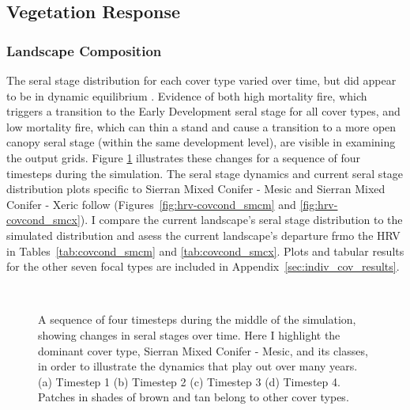 \clearpage



\subsection{Vegetation Response}
\label{subsec:HRVvegresponse}


\subsubsection*{Landscape Composition} 

The seral stage distribution for each cover type varied over time, but did appear to be in dynamic equilibrium \citep{Diamond1969}. Evidence of both high mortality fire, which triggers a transition to the Early Development seral stage for all cover types, and low mortality fire, which can thin a stand and cause a transition to a more open canopy seral stage (within the same development level), are visible in examining the output grids. Figure \ref{fig:covcondmaps} illustrates these changes for a sequence of four timesteps during the simulation. The seral stage dynamics and current seral stage distribution plots specific to Sierran Mixed Conifer - Mesic and Sierran Mixed Conifer - Xeric follow (Figures~\ref{fig:hrv-covcond_smcm} and \ref{fig:hrv-covcond_smcx}). I compare the current landscape's seral stage distribution to the simulated distribution and asess the current landscape's departure frmo the HRV in Tables~\ref{tab:covcond_smcm} and \ref{tab:covcond_smcx}. Plots and tabular results for the other seven focal types are included in Appendix~\ref{sec:indiv_cov_results}.

\begin{figure}[!htbp]
  \centering
  \\%
  \caption{A sequence of four timesteps during the middle of the simulation, showing changes in seral stages over time. Here I highlight the dominant cover type, Sierran Mixed Conifer - Mesic, and its classes, in order to illustrate the dynamics that play out over many years. (a) Timestep 1 (b) Timestep 2 (c) Timestep 3 (d) Timestep 4. Patches in shades of brown and tan belong to other cover types.}
  \label{fig:covcondmaps}
\end{figure}


